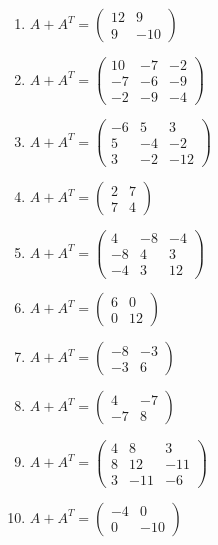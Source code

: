 \begin{enumerate}[label=\arabic*., leftmargin=*, itemsep=1pt]
\item $A+A^T=\left(\begin{smallmatrix}12 & 9\\ 9 & -10\end{smallmatrix}\right)$
\item $A+A^T=\left(\begin{smallmatrix}10 & -7 & -2\\ -7 & -6 & -9\\ -2 & -9 & -4\end{smallmatrix}\right)$
\item $A+A^T=\left(\begin{smallmatrix}-6 & 5 & 3\\ 5 & -4 & -2\\ 3 & -2 & -12\end{smallmatrix}\right)$
\item $A+A^T=\left(\begin{smallmatrix}2 & 7\\ 7 & 4\end{smallmatrix}\right)$
\item $A+A^T=\left(\begin{smallmatrix}4 & -8 & -4\\ -8 & 4 & 3\\ -4 & 3 & 12\end{smallmatrix}\right)$
\item $A+A^T=\left(\begin{smallmatrix}6 & 0\\ 0 & 12\end{smallmatrix}\right)$
\item $A+A^T=\left(\begin{smallmatrix}-8 & -3\\ -3 & 6\end{smallmatrix}\right)$
\item $A+A^T=\left(\begin{smallmatrix}4 & -7\\ -7 & 8\end{smallmatrix}\right)$
\item $A+A^T=\left(\begin{smallmatrix}4 & 8 & 3\\ 8 & 12 & -11\\ 3 & -11 & -6\end{smallmatrix}\right)$
\item $A+A^T=\left(\begin{smallmatrix}-4 & 0\\ 0 & -10\end{smallmatrix}\right)$

\end{enumerate}
